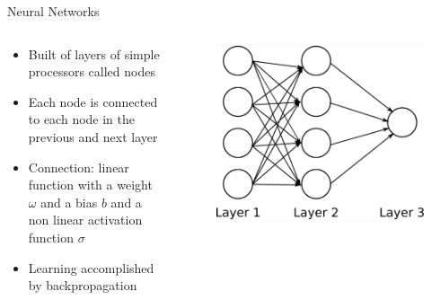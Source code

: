 \documentclass[12pt]{beamer}
\begin{document}
\begin{frame}{Neural Networks}
\begin{columns}
    \begin{column}{0.5\textwidth}
    \begin{itemize}
        \item Built of layers of simple processors called nodes
        \item Each node is connected to each node in the previous and next layer
        \item Connection: linear function with a weight $\omega$ and a bias $b$ 
        and a non linear activation function $\sigma$
        \item Learning accomplished by backpropagation
    \end{itemize}
    \end{column}
    \begin{column}{0.5\textwidth}
    \begin{figure}
        \centering
        \includegraphics[scale=0.05]{network.eps}
        \label{fig:my_label}
    \end{figure}
    \vspace{0.3cm}
    \end{column}
\end{columns}
\end{frame}
\end{document}
